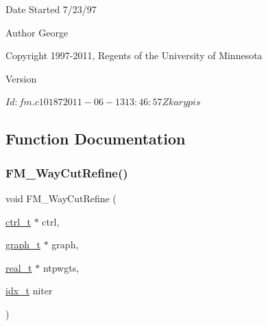 \begin{DoxyDate}{Date}
Started 7/23/97 
\end{DoxyDate}
\begin{DoxyAuthor}{Author}
George 

Copyright 1997-\/2011, Regents of the University of Minnesota 
\end{DoxyAuthor}
\begin{DoxyVersion}{Version}
\begin{DoxyVerb}$Id: fm.c 10187 2011-06-13 13:46:57Z karypis $ \end{DoxyVerb}
 
\end{DoxyVersion}


\subsection{Function Documentation}
\mbox{\label{a00197_a1c215aad2804a5cba2e54e93113bc0d5}} 
\subsubsection{\texorpdfstring{F\+M\+\_\+Way\+Cut\+Refine()}{FM\_2WayCutRefine()}}
{\footnotesize\ttfamily void F\+M\+\_\+Way\+Cut\+Refine (\begin{DoxyParamCaption}\item[{\hyperlink{a00742}{ctrl\+\_\+t} $\ast$}]{ctrl,  }\item[{\hyperlink{a00734}{graph\+\_\+t} $\ast$}]{graph,  }\item[{\hyperlink{a00876_a1924a4f6907cc3833213aba1f07fcbe9}{real\+\_\+t} $\ast$}]{ntpwgts,  }\item[{\hyperlink{a00876_aaa5262be3e700770163401acb0150f52}{idx\+\_\+t}}]{niter }\end{DoxyParamCaption})}

